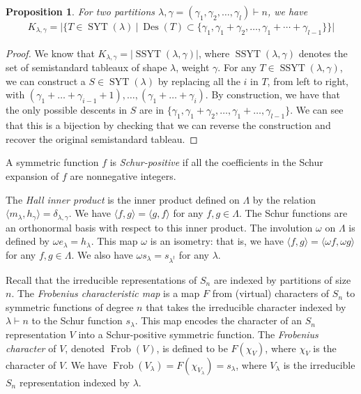 \documentclass[10pt]{amsart}
\theoremstyle{plain}
\theoremstyle{definition}
\theoremstyle{plain}
\theoremstyle{plain}
\newtheorem{prop}[prop]{Proposition}
\theoremstyle{remark}
\theoremstyle{plain}
\theoremstyle{plain}
\DeclareMathOperator{\syt}{SYT}
\DeclareMathOperator{\ssyt}{SSYT}
\DeclareMathOperator{\Frob}{Frob}
\DeclareMathOperator{\des}{Des}
\begin{document}
 \begin{prop}
     For two partitions $\lambda,\gamma = (\gamma_1,\gamma_2,\dots, \gamma_l)\vdash n$, we have
      \begin{align}\label{eq: kostka numb}
     K_{\lambda,\gamma} = | \{T\in \syt(\lambda)  \ | \ \des(T) \subset \{\gamma_1,\gamma_1 + \gamma_2, \dots, \gamma_1 +\cdots + \gamma_{l-1}\} \} |
 \end{align}
 \end{prop}
 \begin{proof}
     We know that $K_{\lambda,\gamma} = | \ssyt(\lambda,\gamma)|$, where $\ssyt(\lambda,\gamma)$ denotes the set of semistandard tableaux of shape $\lambda$, weight $\gamma$. For any $T\in \ssyt(\lambda,\gamma)$, we can construct a $S\in \syt(\lambda)$ by replacing all the $i$ in $T$, from left to right, with $(\gamma_1+\dots+\gamma_{i-1} +1),\dots,(\gamma_1+\dots+\gamma_{i})$. By construction, we have that the only possible descents in $S$ are in $\{\gamma_1,\gamma_1+\gamma_2,\dots, \gamma_1+\dots,\gamma_{l-1}\}$. We can see that this is a bijection by checking that we can reverse the construction and recover the original semistandard tableau.
 \end{proof}


A symmetric function $f$ is \textit{Schur-positive} if all the coefficients in the Schur expansion of $f$ are nonnegative integers. 

The \textit{Hall inner product} is the inner product defined on $\Lambda$ by the relation $\langle m_\lambda, h_\gamma\rangle = \delta_{\lambda,\gamma}$. We have $\langle f,g\rangle = \langle g,f\rangle$ for any $f,g\in \Lambda$.
The Schur functions are an orthonormal basis with respect to this inner product.
The involution $\omega$ on $\Lambda$ is defined by $\omega e_\lambda= h_\lambda$. This map $\omega$ is an isometry: that is, we have $\langle f,g\rangle = \langle \omega f,\omega g\rangle$ for any $f,g \in \Lambda$.
We also have $\omega s_\lambda = s_{\lambda^t}$ for any $\lambda$.


Recall that the irreducible representations of $S_n$ are indexed by partitions of size $n$.
The \textit{Frobenius characteristic map} is a map $F$ from (virtual) characters of $S_n$ to symmetric functions of degree $n$ that takes the irreducible character  indexed by $\lambda\vdash n$ to the Schur function $s_\lambda$. This map encodes the character of an $S_n$ representation $V$ into a Schur-positive symmetric function.
The \textit{Frobenius character} of $V$, denoted $\Frob(V)$, is defined to be $F(\chi_V)$, where $\chi_V$ is the character of $V$. We have $\Frob(V_\lambda) = F(\chi_{V_\lambda}) = s_\lambda$, where $V_\lambda$ is the irreducible $S_n$ representation indexed by $\lambda$.
\end{document}
